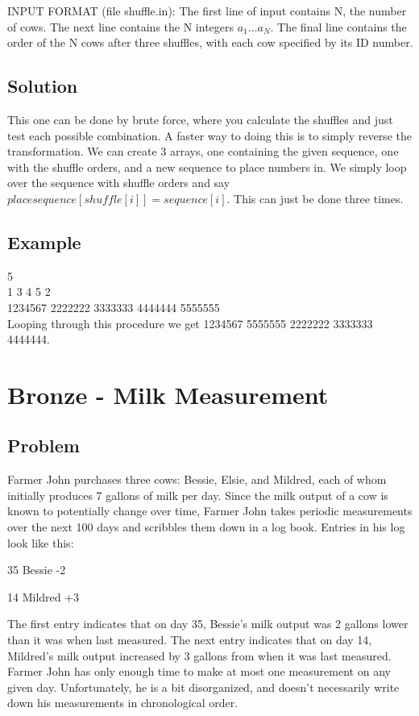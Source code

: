 \documentclass[11pt]{article}
\begin{document}
        INPUT FORMAT (file shuffle.in):
        The first line of input contains N, the number of cows. The next line contains the N integers $a_1…a_N$. The final line contains the order of the N cows after three shuffles, with each cow specified by its ID number.
        
    \subsection{Solution}
        This one can be done by brute force, where you calculate the shuffles and just test each possible combination. A faster way to doing this is to simply reverse the transformation. We can create 3 arrays, one containing the given sequence, one with the shuffle orders, and a new sequence to place numbers in. We simply loop over the sequence with shuffle orders and say $placesequence[shuffle[i]] = sequence[i]$. This can just be done three times.
        
    \subsection{Example}
        5 \\
        1 3 4 5 2 \\
        1234567 2222222 3333333 4444444 5555555 \\
        
        Looping through this procedure we get 1234567 5555555 2222222 3333333 4444444.
        
\section{Bronze - Milk Measurement}
        \subsection{Problem}
            Farmer John purchases three cows: Bessie, Elsie, and Mildred, each of whom initially produces 7 gallons of milk per day. Since the milk output of a cow is known to potentially change over time, Farmer John takes periodic measurements over the next 100 days and scribbles them down in a log book. Entries in his log look like this:
            
            35 Bessie -2
            
            14 Mildred +3
            
            The first entry indicates that on day 35, Bessie's milk output was 2 gallons lower than it was when last measured. The next entry indicates that on day 14, Mildred's milk output increased by 3 gallons from when it was last measured. Farmer John has only enough time to make at most one measurement on any given day. Unfortunately, he is a bit disorganized, and doesn't necessarily write down his measurements in chronological order.
            
\end{document}

